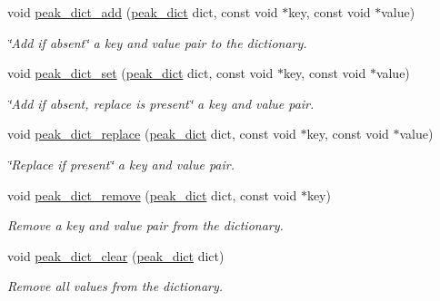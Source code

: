 \begin{CompactItemize}
void \hyperlink{group__dict_ga27}{peak\_\-dict\_\-add} (\hyperlink{group__dict_ga0}{peak\_\-dict} dict, const void $\ast$key, const void $\ast$value)
\begin{CompactList}\small\item\em \char`\"{}Add if absent\char`\"{} a key and value pair to the dictionary. \item\end{CompactList}\item 
void \hyperlink{group__dict_ga28}{peak\_\-dict\_\-set} (\hyperlink{group__dict_ga0}{peak\_\-dict} dict, const void $\ast$key, const void $\ast$value)
\begin{CompactList}\small\item\em \char`\"{}Add if absent, replace is present\char`\"{} a key and value pair. \item\end{CompactList}\item 
void \hyperlink{group__dict_ga29}{peak\_\-dict\_\-replace} (\hyperlink{group__dict_ga0}{peak\_\-dict} dict, const void $\ast$key, const void $\ast$value)
\begin{CompactList}\small\item\em \char`\"{}Replace if present\char`\"{} a key and value pair. \item\end{CompactList}\item 
void \hyperlink{group__dict_ga30}{peak\_\-dict\_\-remove} (\hyperlink{group__dict_ga0}{peak\_\-dict} dict, const void $\ast$key)
\begin{CompactList}\small\item\em Remove a key and value pair from the dictionary. \item\end{CompactList}\item 
void \hyperlink{group__dict_ga31}{peak\_\-dict\_\-clear} (\hyperlink{group__dict_ga0}{peak\_\-dict} dict)
\begin{CompactList}\small\item\em Remove all values from the dictionary. \item\end{CompactList}\end{CompactItemize}
